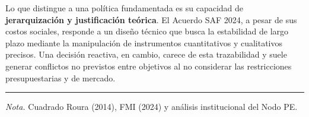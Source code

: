 \documentclass[12pt,spanish]{article}
\newcommand{\fuente}[1]{
  \vspace{4pt}
  \begin{flushleft}
    \small
    \textit{Nota.} #1
  \end{flushleft}
}
\begin{document}
Lo que distingue a una política fundamentada es su capacidad de
\textbf{jerarquización y justificación teórica}. El Acuerdo SAF 2024, a
pesar de sus costos sociales, responde a un diseño técnico que busca la
estabilidad de largo plazo mediante la manipulación de instrumentos
cuantitativos y cualitativos precisos. Una decisión reactiva, en cambio,
carece de esta trazabilidad y suele generar conflictos no previstos
entre objetivos al no considerar las restricciones presupuestarias y de
mercado.

\begin{center}\rule{0.5\linewidth}{0.5pt}\end{center}

\fuente{Cuadrado Roura (2014), FMI (2024) y análisis institucional del Nodo PE.}
\end{document}
